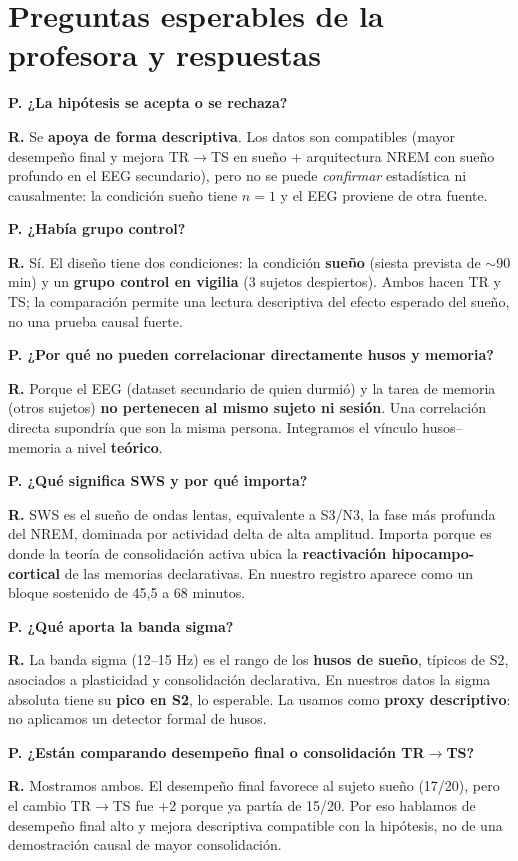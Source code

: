 \documentclass[11pt,a4paper]{article}
\newcommand{\pregunta}[1]{\vspace{4pt}\noindent\textbf{\color{navy}P. #1}\par\nopagebreak}
\newcommand{\respuesta}[1]{\noindent\textbf{R.} #1\par}
\begin{document}
\section{Preguntas esperables de la profesora y respuestas}

\pregunta{¿La hipótesis se acepta o se rechaza?}
\respuesta{Se \textbf{apoya de forma descriptiva}. Los datos son compatibles (mayor desempeño
final y mejora TR$\to$TS en sueño + arquitectura NREM con sueño profundo en el EEG secundario),
pero no se puede \emph{confirmar} estadística ni causalmente: la condición sueño tiene $n=1$ y
el EEG proviene de otra fuente.}

\pregunta{¿Había grupo control?}
\respuesta{Sí. El diseño tiene dos condiciones: la condición \textbf{sueño} (siesta prevista de $\sim$90 min)
y un \textbf{grupo control en vigilia} (3 sujetos despiertos). Ambos hacen TR y TS; la
comparación permite una lectura descriptiva del efecto esperado del sueño, no una prueba causal fuerte.}

\pregunta{¿Por qué no pueden correlacionar directamente husos y memoria?}
\respuesta{Porque el EEG (dataset secundario de quien durmió) y la tarea de memoria (otros
sujetos) \textbf{no pertenecen al mismo sujeto ni sesión}. Una correlación directa supondría
que son la misma persona. Integramos el vínculo husos--memoria a nivel \textbf{teórico}.}

\pregunta{¿Qué significa SWS y por qué importa?}
\respuesta{SWS es el sueño de ondas lentas, equivalente a S3/N3, la fase más profunda del NREM,
dominada por actividad delta de alta amplitud. Importa porque es donde la teoría de
consolidación activa ubica la \textbf{reactivación hipocampo-cortical} de las memorias
declarativas. En nuestro registro aparece como un bloque sostenido de 45,5 a 68 minutos.}

\pregunta{¿Qué aporta la banda sigma?}
\respuesta{La banda sigma (12--15 Hz) es el rango de los \textbf{husos de sueño}, típicos de S2,
asociados a plasticidad y consolidación declarativa. En nuestros datos la sigma absoluta tiene
su \textbf{pico en S2}, lo esperable. La usamos como \textbf{proxy descriptivo}: no aplicamos un
detector formal de husos.}

\pregunta{¿Están comparando desempeño final o consolidación TR$\to$TS?}
\respuesta{Mostramos ambos. El desempeño final favorece al sujeto sueño (17/20), pero el cambio
TR$\to$TS fue +2 porque ya partía de 15/20. Por eso hablamos de desempeño final alto y mejora
descriptiva compatible con la hipótesis, no de una demostración causal de mayor consolidación.}
\end{document}
